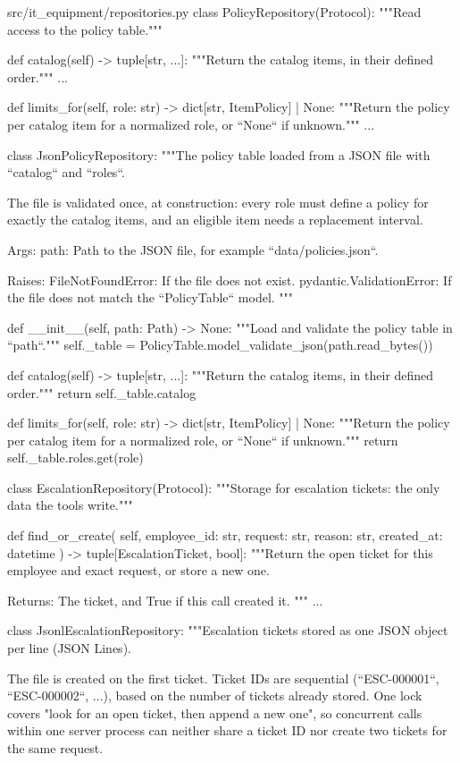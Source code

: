 \documentclass[11pt,letterpaper]{article}
\renewcommand{\_}{\textunderscore\allowbreak}
\begin{document}
\begin{codebox}{src/it_equipment/repositories.py}
class PolicyRepository(Protocol):
    """Read access to the policy table."""

    def catalog(self) -> tuple[str, ...]:
        """Return the catalog items, in their defined order."""
        ...

    def limits_for(self, role: str) -> dict[str, ItemPolicy] | None:
        """Return the policy per catalog item for a normalized role, or ``None`` if unknown."""
        ...


class JsonPolicyRepository:
    """The policy table loaded from a JSON file with ``catalog`` and ``roles``.

    The file is validated once, at construction: every role must define a policy for
    exactly the catalog items, and an eligible item needs a replacement interval.

    Args:
        path: Path to the JSON file, for example ``data/policies.json``.

    Raises:
        FileNotFoundError: If the file does not exist.
        pydantic.ValidationError: If the file does not match the ``PolicyTable`` model.
    """

    def __init__(self, path: Path) -> None:
        """Load and validate the policy table in ``path``."""
        self._table = PolicyTable.model_validate_json(path.read_bytes())

    def catalog(self) -> tuple[str, ...]:
        """Return the catalog items, in their defined order."""
        return self._table.catalog

    def limits_for(self, role: str) -> dict[str, ItemPolicy] | None:
        """Return the policy per catalog item for a normalized role, or ``None`` if unknown."""
        return self._table.roles.get(role)


class EscalationRepository(Protocol):
    """Storage for escalation tickets: the only data the tools write."""

    def find_or_create(
        self, employee_id: str, request: str, reason: str, created_at: datetime
    ) -> tuple[EscalationTicket, bool]:
        """Return the open ticket for this employee and exact request, or store a new one.

        Returns:
            The ticket, and True if this call created it.
        """
        ...


class JsonlEscalationRepository:
    """Escalation tickets stored as one JSON object per line (JSON Lines).

    The file is created on the first ticket. Ticket IDs are sequential (``ESC-000001``,
    ``ESC-000002``, ...), based on the number of tickets already stored. One lock covers "look
    for an open ticket, then append a new one", so concurrent calls within one server process
    can neither share a ticket ID nor create two tickets for the same request.


\end{codebox}
\end{document}
